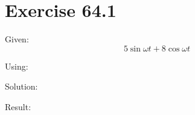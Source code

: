 \documentclass[a4paper, 10pt]{scrartcl}
\begin{document}
\section{Exercise 64.1}

Given:
\[5\sin{\omega t} + 8\cos{\omega t}\]

Using:

Solution:

Result:
\end{document}
